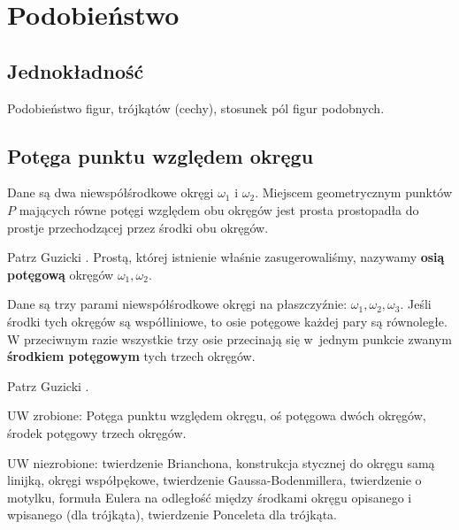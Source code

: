 %

\section{Podobieństwo}
\subsection{Jednokładność}
Podobieństwo figur, trójkątów (cechy), stosunek pól figur podobnych.




\subsection{Potęga punktu względem okręgu}

\begin{proposition}
\label{guzicki_6_11}%
    Dane są dwa niewspółśrodkowe okręgi $\omega_1$ i $\omega_2$.
    Miejscem geometrycznym punktów $P$ mających równe potęgi względem obu okręgów jest prosta prostopadła do prostje przechodzącej przez środki obu okręgów.
%
\end{proposition}

Patrz Guzicki \cite[s. 173, 174]{guzicki_2021}.
Prostą, której istnienie właśnie zasugerowaliśmy, nazywamy \textbf{osią potęgową} okręgów $\omega_1, \omega_2$.

\begin{corollary}
	Dane są trzy parami niewspółśrodkowe okręgi na płaszczyźnie: $\omega_1, \omega_2, \omega_3$.
	Jeśli środki tych okręgów są współliniowe, to osie potęgowe każdej pary są równoległe.
	W przeciwnym razie wszystkie trzy osie przecinają się w~jednym punkcie zwanym \textbf{środkiem potęgowym} tych trzech okręgów.
\end{corollary}

Patrz Guzicki \cite[s. 174]{guzicki_2021}.


UW zrobione:
Potęga punktu względem okręgu, oś potęgowa dwóch okręgów, środek potęgowy trzech okręgów.

UW niezrobione:
twierdzenie Brianchona, konstrukcja stycznej do okręgu samą linijką, okręgi współpękowe, twierdzenie Gaussa-Bodenmillera, twierdzenie o motylku, formuła Eulera na odległość między środkami okręgu opisanego i wpisanego (dla trójkąta), twierdzenie Ponceleta dla trójkąta.

